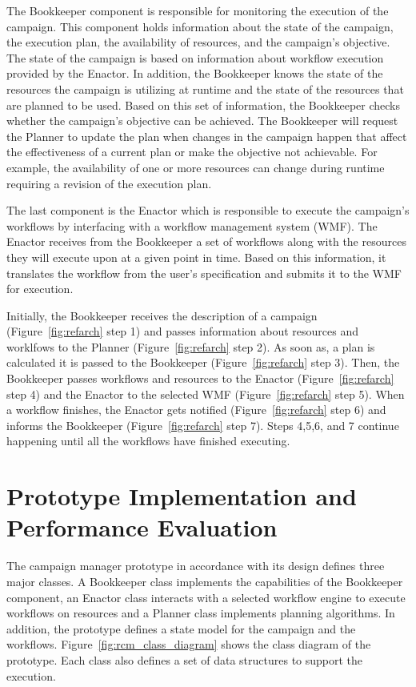 The Bookkeeper component is responsible for monitoring the execution of the 
campaign. This component holds information about the state of the campaign, 
the execution plan, the availability of resources, and the campaign's 
objective. The state of the campaign is based on information about workflow 
execution provided by the Enactor. In addition, the Bookkeeper knows the state 
of the resources the campaign is utilizing at runtime and the state of the 
resources that are planned to be used. Based on this set of information, the 
Bookkeeper checks whether the campaign's objective can be achieved. The 
Bookkeeper will request the Planner to update the plan when changes in the 
campaign happen that affect the effectiveness of a current plan or make the 
objective not achievable. For example, the availability of one or more 
resources can change during runtime requiring a revision of the execution plan.

The last component is the Enactor which is responsible to execute the 
campaign's workflows by interfacing with a workflow management system (WMF).
The Enactor receives from the Bookkeeper a set of workflows along with the 
resources they will execute upon at a given point in time. Based on this 
information, it translates the workflow from the user's specification and 
submits it to the WMF for execution.

Initially, the Bookkeeper receives the description of a campaign 
(Figure~\ref{fig:refarch} step 1) and passes information about resources and 
worklfows to the Planner (Figure~\ref{fig:refarch} step 2). As soon as, a plan 
is calculated it is passed to the Bookkeeper (Figure~\ref{fig:refarch} step 3).
Then, the Bookkeeper passes workflows and resources to the Enactor 
(Figure~\ref{fig:refarch} step 4) and the Enactor to the selected WMF 
(Figure~\ref{fig:refarch} step 5). When a workflow finishes, the Enactor gets 
notified (Figure~\ref{fig:refarch} step 6) and informs the Bookkeeper 
(Figure~\ref{fig:refarch} step 7). Steps 4,5,6, and 7 continue happening until 
all the workflows have finished executing.

\section{Prototype Implementation and Performance Evaluation}
\label{sec:cm_impl}

The campaign manager prototype in accordance with its design defines three 
major classes. A Bookkeeper class implements the capabilities of the 
Bookkeeper component, an Enactor class interacts with a selected workflow 
engine to execute workflows on resources and a Planner class implements 
planning algorithms. In addition, the prototype defines a state model for the 
campaign and the workflows. Figure~\ref{fig:rcm_class_diagram} shows the class 
diagram of the prototype. Each class also defines a set of data structures to 
support the execution. 


